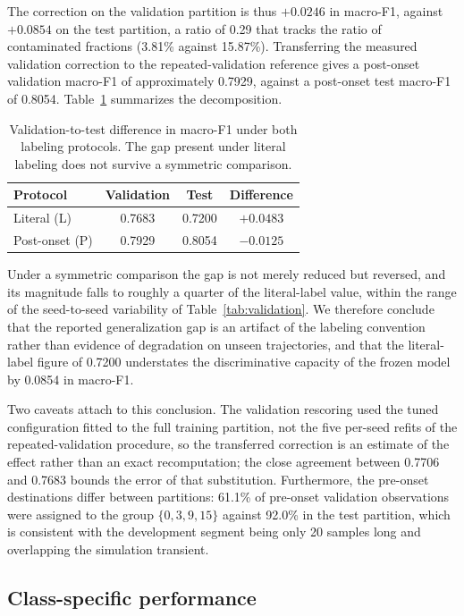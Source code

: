 \documentclass[10pt,twocolumn,a4paper]{article}
\begin{document}
The correction on the validation partition is thus $+0.0246$ in macro-F1,
against $+0.0854$ on the test partition, a ratio of 0.29 that tracks the ratio
of contaminated fractions (3.81\% against 15.87\%). Transferring the measured
validation correction to the repeated-validation reference gives a post-onset
validation macro-F1 of approximately 0.7929, against a post-onset test macro-F1
of 0.8054. Table~\ref{tab:gap} summarizes the decomposition.

\begin{table}[H]
\centering
\caption{Validation-to-test difference in macro-F1 under both labeling
protocols. The gap present under literal labeling does not survive a symmetric
comparison.}
\label{tab:gap}
\small
\begin{tabular}{lccc}
\toprule
Protocol & Validation & Test & Difference\\
\midrule
Literal (L)    & 0.7683 & 0.7200 & $+0.0483$\\
Post-onset (P) & 0.7929 & 0.8054 & $-0.0125$\\
\bottomrule
\end{tabular}
\end{table}

Under a symmetric comparison the gap is not merely reduced but reversed, and
its magnitude falls to roughly a quarter of the literal-label value, within the
range of the seed-to-seed variability of Table~\ref{tab:validation}. We
therefore conclude that the reported generalization gap is an artifact of the
labeling convention rather than evidence of degradation on unseen trajectories,
and that the literal-label figure of 0.7200 understates the discriminative
capacity of the frozen model by 0.0854 in macro-F1.

Two caveats attach to this conclusion. The validation rescoring used the tuned
configuration fitted to the full training partition, not the five per-seed
refits of the repeated-validation procedure, so the transferred correction is
an estimate of the effect rather than an exact recomputation; the close
agreement between 0.7706 and 0.7683 bounds the error of that substitution.
Furthermore, the pre-onset destinations differ between partitions: 61.1\% of
pre-onset validation observations were assigned to the group $\{0,3,9,15\}$
against 92.0\% in the test partition, which is consistent with the development
segment being only 20 samples long and overlapping the simulation transient.

\subsection{Class-specific performance}
\end{document}

